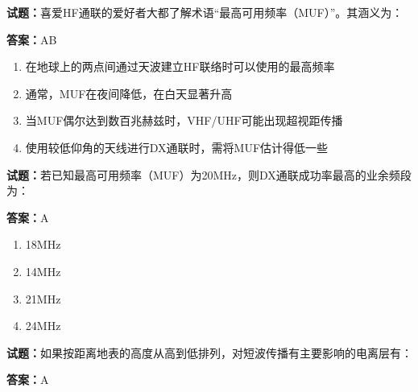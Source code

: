 \documentclass{ctexbook}
\begin{document}




\vspace{1em}

\textbf{试题：}喜爱HF通联的爱好者大都了解术语“最高可用频率（MUF）”。其涵义为： 

\textbf{答案：}AB 

\begin{enumerate}[leftmargin=3em]
  \item 在地球上的两点间通过天波建立HF联络时可以使用的最高频率 

  \item 通常，MUF在夜间降低，在白天显著升高 

  \item 当MUF偶尔达到数百兆赫兹时，VHF/UHF可能出现超视距传播 

  \item 使用较低仰角的天线进行DX通联时，需将MUF估计得低一些 

\end{enumerate}





\vspace{1em}

\textbf{试题：}若已知最高可用频率（MUF）为20MHz，则DX通联成功率最高的业余频段为： 

\textbf{答案：}A 

\begin{enumerate}[leftmargin=3em]
  \item 18MHz 

  \item 14MHz 

  \item 21MHz 

  \item 24MHz 

\end{enumerate}





\vspace{1em}

\textbf{试题：}如果按距离地表的高度从高到低排列，对短波传播有主要影响的电离层有： 

\textbf{答案：}A 
\end{document}
